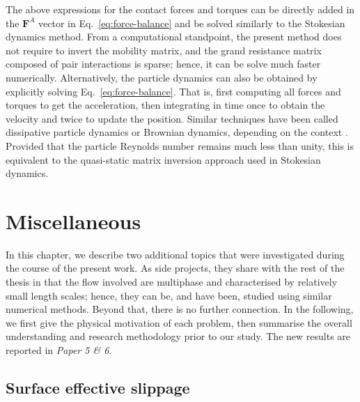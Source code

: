 The above expressions for the contact forces and torques can be directly added in the ${\bm F}^A$ vector in Eq.\ \eqref{eq:force-balance}
and be solved similarly to the Stokesian dynamics method.
From a computational standpoint, the present method does not require to invert the mobility matrix,
and the grand resistance matrix composed of pair interactions is sparse;
hence, it can be solve much faster numerically.
Alternatively, the particle dynamics can also be obtained by explicitly solving Eq.\ \eqref{eq:force-balance}.
That is, first computing all forces and torques to get the acceleration, then integrating in time once to obtain the velocity and twice to update the position.
Similar techniques have been called dissipative particle dynamics or Brownian dynamics, depending on the context \citep{Hoogerbrugge_1992, Groot_Warren_1997}.
Provided that the particle Reynolds number remains much less than unity, this is equivalent to the quasi-static matrix inversion approach used in Stokesian dynamics.



\chapter{Miscellaneous}  \label{chp:misc}


In this chapter, we describe two additional topics that were investigated during the course of the present work.
As side projects, they share with the rest of the thesis in that the flow involved are multiphase and characterised by relatively small length scales; hence, they can be, and have been, studied using similar numerical methods.
Beyond that, there is no further connection.
In the following, we first give the physical motivation of each problem, then summarise the overall understanding and research methodology prior to our study.
The new results are reported in \emph{Paper 5 \& 6}.


\section{Surface effective slippage}

